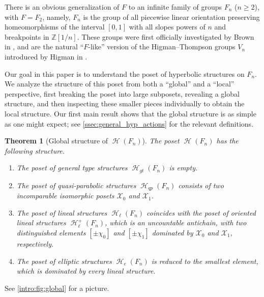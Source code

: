 \documentclass[reqno,12pt]{amsart}\setcounter{tocdepth}{1}
\newtheorem{thmA}{Theorem}
\theoremstyle{definition}
\newcommand{\Z}{\mathbb{Z}}
\DeclareMathOperator{\Hyp}{\mathcal{H}}
\newcommand{\X}{\mathcal{X}}
\numberwithin{equation}{section}
\begin{document}
There is an obvious generalization of $F$ to an infinite family of groups $F_n$ ($n\ge 2$), with $F=F_2$, namely, $F_n$ is the group of all piecewise linear orientation preserving homeomorphisms of the interval $[0,1]$ with all slopes powers of $n$ and breakpoints in $\Z[1/n]$. These groups were first officially investigated by Brown in \cite{brown87}, and are the natural ``$F$-like'' version of the Higman--Thompson groups $V_n$ introduced by Higman in \cite{higman74}.

\medskip

Our goal in this paper is to understand the poset of hyperbolic structures on $F_n$. We analyze the structure of this poset from both a ``global'' and a ``local'' perspective, first breaking the poset into large subposets, revealing a global structure, and then inspecting these smaller pieces individually to obtain the local structure. Our first main result shows that the global structure is as simple as one might expect; see \cref{ssec:general_hyp_actions} for the relevant definitions.

\begin{thmA}[Global structure of $\Hyp(F_n)$]
\label{intro:thm:global}
The poset $\Hyp(F_n)$ has the following structure.
\begin{enumerate}
   \item The poset of general type structures $\Hyp_{gt}(F_n)$ is empty.
   \item The poset of quasi-parabolic structures $\Hyp_{qp}(F_n)$ consists of two incomparable isomorphic posets $\X_0$ and $\X_1$.
   \item The poset of lineal structures $\Hyp_{\ell}(F_n)$ coincides with the poset of oriented lineal structures $\Hyp_{\ell}^+(F_n)$, which is an uncountable antichain, with two distinguished elements $[\pm\chi_0]$ and $[\pm\chi_1]$ dominated by $\X_0$ and $\X_1$, respectively.
   \item The poset of elliptic structures $\Hyp_e(F_n)$ is reduced to the smallest element, which is dominated by every lineal structure.
\end{enumerate}
\end{thmA}

See \cref{intro:fig:global} for a picture.
\end{document}
